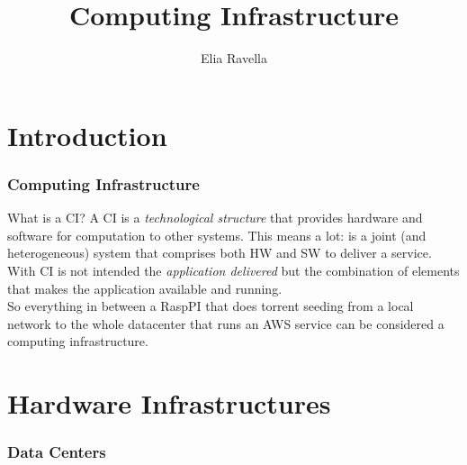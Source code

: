 \documentclass[10pt,a4paper]{article}
\title{Computing Infrastructure}
\author{Elia Ravella}
\begin{document}
	\begin{titlepage}
		\maketitle
	\end{titlepage}
	
	\tableofcontents
	\clearpage
	
	\part{Introduction}
		\section{Computing Infrastructure}
			What is a CI? A CI is a \emph{technological structure} that provides hardware and software for computation to other systems. This means a lot: is a joint (and heterogeneous) system that comprises both HW and SW to deliver a service. With CI is not intended the \emph{application delivered} but the combination of elements that makes the application available and running.\\
			So everything in between a RaspPI that does torrent seeding from a local network to the whole datacenter that runs an AWS service can be considered a computing infrastructure.
			
	\part{Hardware Infrastructures}
		\section{Data Centers}
\end{document}
